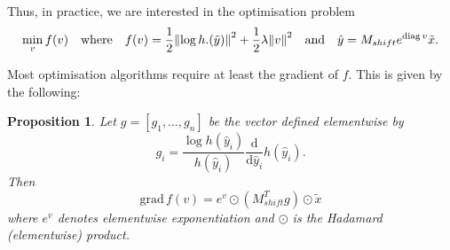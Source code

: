 \documentclass{article}
\newtheorem{proposition}{Proposition}
\begin{document}
Thus, in practice, we are interested in the optimisation problem
\begin{equation}
    \label{eq: cost function parameterised}
\min_{v} f(v)
\quad\text{where}\quad 
f(v)
=
\frac{1}{2}\norm{\log h.(\hat{y})}^2 + \frac{1}{2}\lambda \norm{v}^2
\quad\text{and}\quad 
\hat{y} = M_{shift} e^{\mathrm{diag}\, v} \tilde{x}
.\end{equation}

Most optimisation algorithms require at least the gradient of $f$. This is given by the following:
\begin{proposition}
    Let $g = [g_1, \dots, g_n]$ be the vector defined elementwise by 
    $$
    g_i = \frac{\log h(\hat{y}_i)}{h(\hat{y}_i)} \frac{\mathrm{d}}{\mathrm{d}\hat{y}_i} h(\hat{y}_i)
    .$$
    Then 
    $$
    \mathrm{grad}\, f(v) = e^v \odot (M_{shift}^T g) \odot \tilde{x} 
    $$
    where $e^v$ denotes elementwise exponentiation and $\odot$ is the Hadamard (elementwise) product.
\end{proposition}
\end{document}
